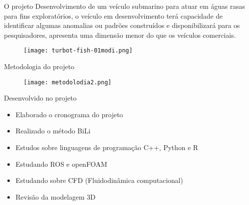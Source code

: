 
\begin{frame}[c]{O projeto}
    Desenvolvimento de um veículo submarino para atuar em águas rasas para fins exploratórios,
    o veículo em desenvolvimento terá capacidade de identificar algumas anomalias ou padrões construídos
    e disponibilizará para os pesquisadores, apresenta uma dimensão menor do que os veículos comerciais.
    \begin{figure}
        \texttt{[image: turbot-fish-01modi.png]}
    \end{figure}
    
\end{frame}
\begin{frame}[c]{Metodologia do projeto }
        \begin{figure}
        \texttt{[image: metodolodia2.png]}
    \end{figure}
\end{frame}
\begin{frame}[t]{Desenvolvido no projeto}
    \begin{itemize}
        \item Elaborado o cronograma do projeto
        \item Realizado o método BiLi
        \item Estudos sobre linguagens de programação C++, Python e R
        \item Estudando ROS e openFOAM
        \item Estudando sobre CFD (Fluidodinâmica computacional)
        \item Revisão da modelagem 3D 
    \end{itemize}    
\end{frame}
